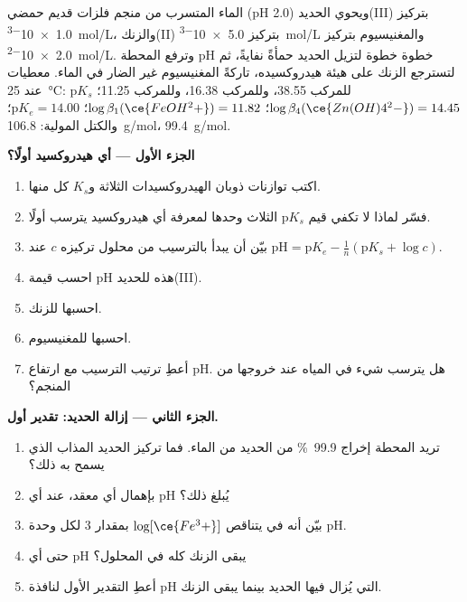 \begin{problem}
\label{pb:b1:precipitation:1}
الماء المتسرب من منجم فلزات قديم حمضي (pH 2.0) ويحوي
الحديد(III) بتركيز \qty{1.0e-3}{mol/L}، والزنك(II) بتركيز \qty{5.0e-3}{mol/L}
والمغنيسيوم بتركيز \qty{2.0e-2}{mol/L}. وترفع المحطة pH خطوة خطوة
لتزيل الحديد حمأةً نفايةً، ثم لتسترجع الزنك على هيئة
هيدروكسيده، تاركةً المغنيسيوم غير الضار في الماء. معطيات عند
\qty{25}{\celsius}: $\mathrm{p}K_s$ للمركب  38.55، وللمركب 
16.38، وللمركب  11.25؛ $\log\beta_4(\ce{Zn(OH)4^2-}) = 14.45$؛
$\log\beta_1(\ce{FeOH^2+}) = 11.82$؛ $\mathrm{p}K_e = 14.00$؛ والكتل المولية:
 \qty{106.8}{g/mol}،  \qty{99.4}{g/mol}.

\medskip
\noindent\textbf{الجزء الأول --- أي هيدروكسيد أولًا؟}
\begin{enumerate}
  \item اكتب توازنات ذوبان الهيدروكسيدات الثلاثة
        و$K_s$ كل منها.
  \item فسّر لماذا لا تكفي قيم $\mathrm{p}K_s$ الثلاث وحدها لمعرفة أي
        هيدروكسيد يترسب أولًا.
  \item بيّن أن  يبدأ بالترسيب من محلول
         تركيزه $c$ عند $\mathrm{pH} = \mathrm{p}K_e -
        \frac1n(\mathrm{p}K_s + \log c)$.
  \item احسب قيمة pH هذه للحديد(III).
  \item احسبها للزنك.
  \item احسبها للمغنيسيوم.
  \item أعطِ ترتيب الترسيب مع ارتفاع pH. هل يترسب
        شيء في المياه عند خروجها من المنجم؟
\end{enumerate}

\medskip
\noindent\textbf{الجزء الثاني --- إزالة الحديد: تقدير أول.}
\begin{enumerate}[resume]
  \item تريد المحطة إخراج \qty{99.9}{\percent} من الحديد من الماء. فما
        تركيز الحديد المذاب الذي يسمح به ذلك؟
  \item بإهمال أي معقد، عند أي pH يُبلغ ذلك؟
  \item بيّن أنه في   يتناقص
        $\log[\ce{Fe^3+}]$ بمقدار 3 لكل وحدة pH.
  \item حتى أي pH يبقى الزنك كله في المحلول؟
  \item أعطِ التقدير الأول لنافذة pH التي يُزال فيها الحديد
        بينما يبقى الزنك.
\end{enumerate}


\end{problem}
